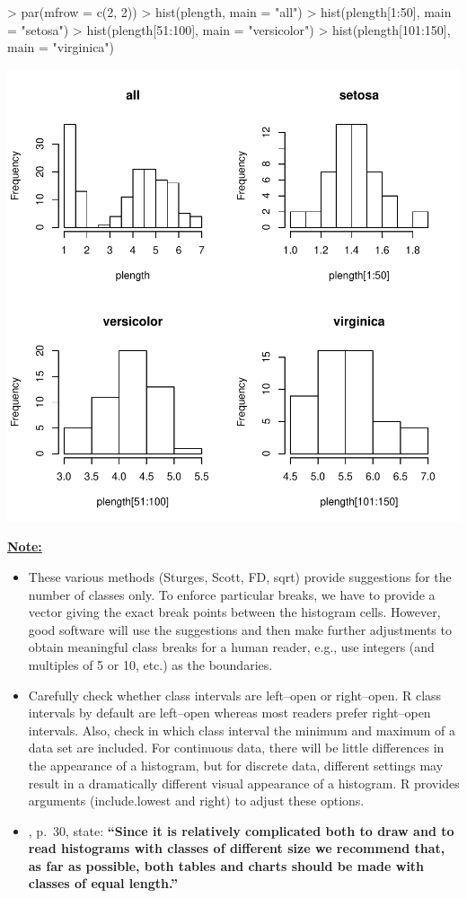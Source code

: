 \begin{Schunk}
\begin{Sinput}
> par(mfrow = c(2, 2))
> hist(plength, main = "all")
> hist(plength[1:50], main = "setosa")
> hist(plength[51:100], main = "versicolor")
> hist(plength[101:150], main = "virginica")
\end{Sinput}
\end{Schunk}
\includegraphics{lect_chapter5_v2-006}

\underline{\bf Note:} 
\begin{itemize}
\item These various methods (Sturges, Scott, FD, sqrt) provide suggestions
for the number of classes only. To enforce particular
breaks, we have to provide a vector giving the exact break points 
between the histogram cells. However, good software will use the suggestions
and then make further adjustments to obtain meaningful class breaks for a human
reader, e.g., use integers (and multiples of 5 or 10, etc.) as the boundaries.

\item Carefully check whether class intervals are left--open or right--open.
R class intervals by default are left--open whereas most readers prefer right--open
intervals. Also, check in which class interval the minimum and maximum of a data set are
included. For continuous data, there will be little differences in the 
appearance of a histogram, but for discrete data, different settings
may result in a dramatically different visual appearance of a histogram.
R provides arguments  (include.lowest and right) to adjust these options.

\item \cite{WWPJH96}, p.~30, state:
{\bf ``Since it is relatively complicated both to draw and to read
histograms with classes of different size we recommend that, as far
as possible, both tables and charts should be made with classes
of equal length.''}
\end{itemize}

